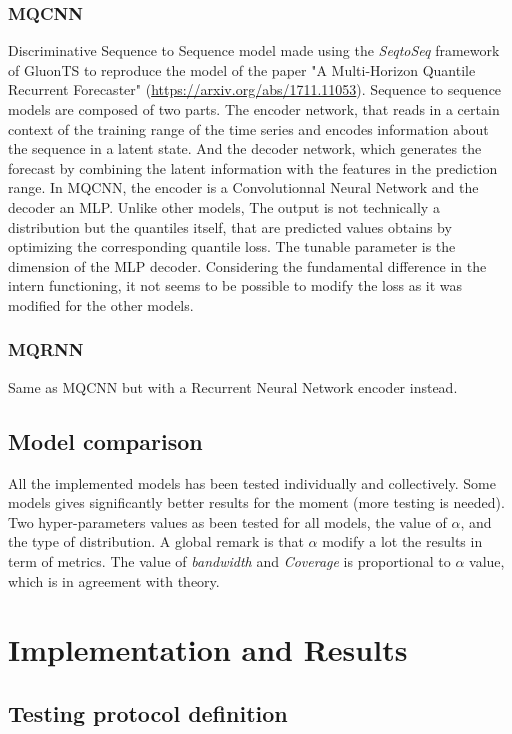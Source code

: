 \documentclass[a4paper, 12pt]{article}
\begin{document}
\subsubsection{MQCNN} \label{descr_mqcnn}
Discriminative Sequence to Sequence model made using the \textit{SeqtoSeq} framework of GluonTS to reproduce the model of the 
paper "A Multi-Horizon Quantile Recurrent Forecaster" (\url{https://arxiv.org/abs/1711.11053}).
Sequence to sequence models are composed of two parts. The encoder network, that reads in a certain context of the training range of the time series 
and encodes information about  the  sequence  in  a  latent  state.
And the decoder network, which generates the forecast by combining the latent information with the features in the prediction range.
In MQCNN, the encoder is a Convolutionnal Neural Network and the decoder an MLP. Unlike other models, The output is not technically a distribution but the quantiles itself, that are predicted values obtains by optimizing the corresponding quantile loss.
The tunable parameter is the  dimension of the MLP decoder.
Considering the fundamental difference in the intern functioning, it not seems to be possible to modify the loss as it was modified for the other models.

\subsubsection{MQRNN} \label{descr_mqrnn}
Same as MQCNN but with a Recurrent Neural Network encoder instead.

\subsection{Model comparison}

All the implemented models has been tested individually and collectively. 
Some models gives significantly better results for the moment (more testing is needed).
Two hyper-parameters values as been tested for all models, the value of $\alpha$, and the type of distribution.
A global remark is that $\alpha$ modify a lot the results in term of metrics. The value of \textit{bandwidth } and \textit{Coverage} is proportional to $\alpha$ value, which is in agreement with theory.

\section{Implementation and Results}

\subsection{Testing protocol definition}
\end{document}
